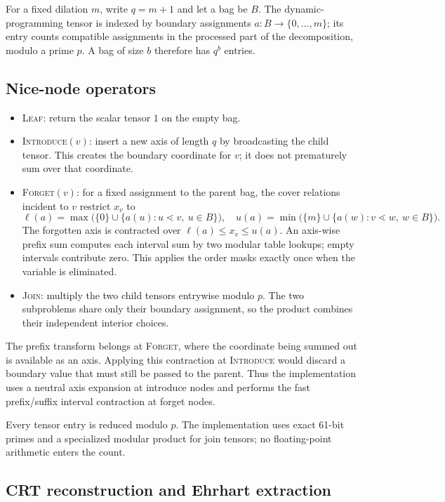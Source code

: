 \documentclass[10pt]{article}
\begin{document}
For a fixed dilation $m$, write $q=m+1$ and let a bag be $B$. The dynamic-programming tensor is indexed by boundary assignments $a:B\to\{0,\ldots,m\}$; its entry counts compatible assignments in the processed part of the decomposition, modulo a prime $p$. A bag of size $b$ therefore has $q^b$ entries.

\subsection{Nice-node operators}

\begin{itemize}
\item \textsc{Leaf}: return the scalar tensor $1$ on the empty bag.
\item \textsc{Introduce}$(v)$: insert a new axis of length $q$ by broadcasting the child tensor. This creates the boundary coordinate for $v$; it does not prematurely sum over that coordinate.
\item \textsc{Forget}$(v)$: for a fixed assignment to the parent bag, the cover relations incident to $v$ restrict $x_v$ to
\[
\ell(a)=\max\bigl(\{0\}\cup\{a(u):u\lessdot v,\ u\in B\}\bigr),
\quad
u(a)=\min\bigl(\{m\}\cup\{a(w):v\lessdot w,\ w\in B\}\bigr).
\]
The forgotten axis is contracted over $\ell(a)\leq x_v\leq u(a)$. An axis-wise prefix sum computes each interval sum by two modular table lookups; empty intervals contribute zero. This applies the order masks exactly once when the variable is eliminated.
\item \textsc{Join}: multiply the two child tensors entrywise modulo $p$. The two subproblems share only their boundary assignment, so the product combines their independent interior choices.
\end{itemize}

The prefix transform belongs at \textsc{Forget}, where the coordinate being summed out is available as an axis. Applying this contraction at \textsc{Introduce} would discard a boundary value that must still be passed to the parent. Thus the implementation uses a neutral axis expansion at introduce nodes and performs the fast prefix/suffix interval contraction at forget nodes.

Every tensor entry is reduced modulo $p$. The implementation uses exact 61-bit primes and a specialized modular product for join tensors; no floating-point arithmetic enters the count.

\subsection{CRT reconstruction and Ehrhart extraction}
\end{document}
